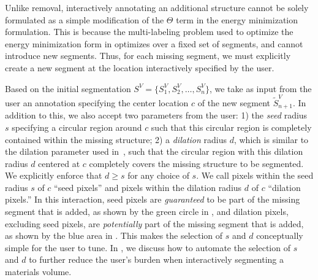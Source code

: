 \documentclass[]{spie}  %
\begin{document}
Unlike removal, interactively annotating an additional structure
cannot be solely formulated as a simple modification of the $\Theta$
term in the energy minimization formulation.  This is because the
multi-labeling problem used to optimize the energy minimization form
in  optimizes over a fixed set of segments, and cannot
introduce new segments.  Thus, for each missing segment, we must
explicitly create a new segment at the location interactively
specified by the user.

Based on the initial segmentation $S^V = \{ S^V_1, S^V_2, \ldots,
S^V_n \} $, we take as input from the user an annotation specifying
the center location $c$ of the new segment $\tilde{S}^V_{n+1}$.  In
addition to this, we also accept two parameters from the user: 1) the
\emph{seed} radius $s$ specifying a circular region around $c$ such
that this circular region is completely contained within the missing
structure; 2) a \textit{dilation} radius $d$, which is similar to the
dilation parameter used in~\cite{waggoner:11}, such that the circular
region with this dilation radius $d$ centered at $c$ completely covers
the missing structure to be segmented.  We explicitly enforce that $d
\geq s$ for any choice of $s$.  We call pixels within the seed radius
$s$ of $c$ ``seed pixels'' and pixels within the dilation radius $d$
of $c$ ``dilation pixels.''  In this interaction, seed pixels are
\emph{guaranteed} to be part of the missing segment that is added, as
shown by the green circle in , and dilation
pixels, excluding seed pixels, are \emph{potentially} part of the
missing segment that is added, as shown by the blue area in
.  This makes the selection of $s$ and $d$
conceptually simple for the user to tune.  In , we discuss
how to automate the selection of $s$ and $d$ to further reduce the
user's burden when interactively segmenting a materials volume.
\end{document}
